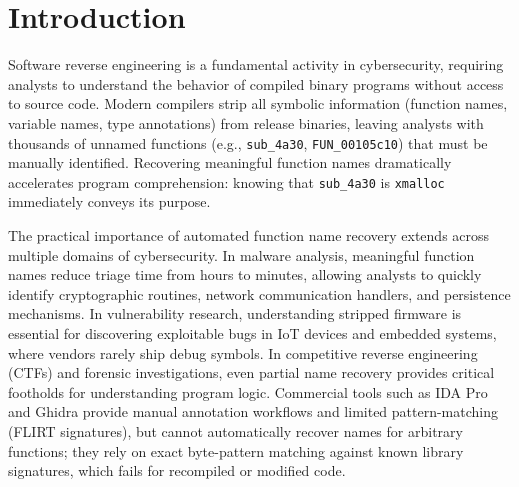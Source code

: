 \documentclass[sigconf,nonacm]{acmart}
\begin{document}

\maketitle
\hypersetup{colorlinks=true,linkcolor=blue,citecolor=blue,urlcolor=blue}

\section{Introduction}
\label{sec:intro}

Software reverse engineering is a fundamental activity in cybersecurity, requiring analysts to understand the behavior of compiled binary programs without access to source code. Modern compilers strip all symbolic information (function names, variable names, type annotations) from release binaries, leaving analysts with thousands of unnamed functions (e.g., \texttt{sub\_4a30}, \texttt{FUN\_00105c10}) that must be manually identified. Recovering meaningful function names dramatically accelerates program comprehension: knowing that \texttt{sub\_4a30} is \texttt{xmalloc} immediately conveys its purpose.

The practical importance of automated function name recovery extends across multiple domains of cybersecurity. In malware analysis, meaningful function names reduce triage time from hours to minutes, allowing analysts to quickly identify cryptographic routines, network communication handlers, and persistence mechanisms. In vulnerability research, understanding stripped firmware is essential for discovering exploitable bugs in IoT devices and embedded systems, where vendors rarely ship debug symbols. In competitive reverse engineering (CTFs) and forensic investigations, even partial name recovery provides critical footholds for understanding program logic. Commercial tools such as IDA Pro and Ghidra provide manual annotation workflows and limited pattern-matching (FLIRT signatures), but cannot automatically recover names for arbitrary functions; they rely on exact byte-pattern matching against known library signatures, which fails for recompiled or modified code.
\end{document}
